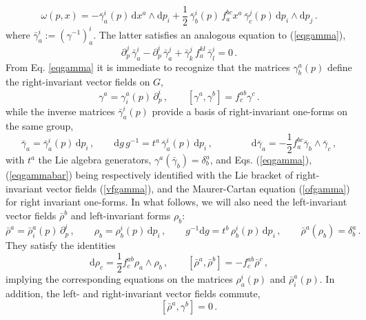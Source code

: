 \documentclass[12pt,a4paper]{article}
\numberwithin{equation}{section}
\theoremstyle{definition}
\newcommand{\dd}{\mathrm{d}}
\newcommand{\eqn}{\eqref}
\begin{document}
\begin{equation}\label{omega}
\omega(p,x)=-\bar\gamma_a^i(p)\,\dd x^a\wedge \dd p_i+\frac12\,\bar\gamma_b^i(p)\,f_a^{bc}x^a\,\bar\gamma_c^j(p)\,\dd p_i\wedge \dd p_j\,.
\end{equation}
where $\bar\gamma^i_a:=\left(\gamma^{-1}\right)^i_a$. The latter satisfies an analogous equation to  (\ref{eqgamma}),
\begin{equation}\label{eqgammabar}
\partial^j_p\,\bar\gamma^i_a-\partial^i_p\,\bar\gamma^j_a+\bar\gamma^j_k\,f^{kl}_a\,\bar\gamma^i_l=0\,.
\end{equation}
From Eq. \eqn{eqgamma} it is immediate to recognize  that the matrices $\gamma^a_b(p)$ define the right-invariant vector fields on $G$,
\begin{equation}\label{vfgamma}
\gamma^a=\gamma^a_i(p)\,\partial^i_p\,,\qquad  [ \gamma^a, \gamma^b]=f^{ab}_c \gamma^c\,.
\end{equation}
while the inverse matrices $\bar\gamma_a^i(p)$ provide a  basis of right-invariant one-forms on the same group,
\begin{equation}\label{ofgamma}
 \bar\gamma_a= \bar\gamma_a^i(p)\,\dd p_i\,,\qquad  \dd g\,g^{-1}=t^a\, \bar\gamma_a^i(p)\,\dd p_i\,, \qquad \qquad \dd\bar\gamma_a=-\frac12f_a^{bc}\bar\gamma_b\wedge \bar\gamma_c\,,
\end{equation}
with $t^a$ the Lie algebra generators, $ \gamma^a (\bar\gamma_b)=\delta^a_b$, and Eqs. (\ref{eqgamma}), (\ref{eqgammabar})  being respectively identified with the Lie bracket of right-invariant vector fields (\ref{vfgamma}), and the Maurer-Cartan equation (\ref{ofgamma}) for right invariant one-forms. In what follows, we will also need the left-invariant   vector fields $\bar\rho^b$ and left-invariant forms $\rho_b$:
\begin{equation}
   \bar \rho^a=\bar \rho^a_i(p)\,\partial_p^i\,,\qquad \rho_b=\rho_b^i(p)\,\dd p_i\,,\qquad g^{-1}  \dd g=t^b \,\rho^i_b(p)\,\dd p_i\,,\qquad  \bar \rho^a(\rho_b)=\delta_b^a\,.
\end{equation}
They satisfy the identities 
\begin{equation}
    \dd\rho_c=\frac12f_c^{ab}\rho_a\wedge \rho_b\,,\qquad 
  [\bar \rho^a,\bar \rho^b]=-f^{ab}_c\bar\rho^c\,,
  \end{equation}
implying the corresponding equations on the matrices $\rho^i_a(p)$ and $\bar \rho^a_i(p)$.
In addition, the left- and right-invariant vector fields commute,
\begin{equation}\label{rhoeq}
\qquad [\bar \rho^a, \gamma^b]=0\,. 
\end{equation}
\end{document}

